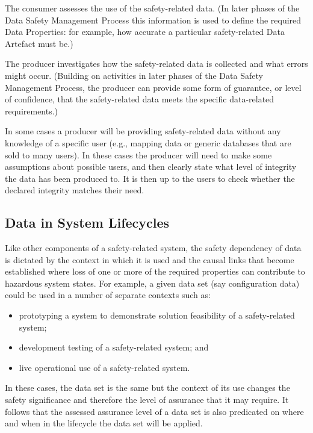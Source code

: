 The consumer assesses the use of the safety-related data. (In later phases of the Data Safety Management Process this information is used to define the required Data Properties: for example, how accurate a particular safety-related Data Artefact must be.)

The producer investigates how the safety-related data is collected and what errors might occur. (Building on activities in later phases of the Data Safety Management Process, the producer can provide some form of guarantee, or level of confidence, that the safety-related data meets the specific data-related requirements.)

In some cases a producer will be providing safety-related data without any knowledge of a specific user (e.g., mapping data or generic \glspl{database} that are sold to many users). In these cases the producer will need to make some assumptions about possible users, and then clearly state what level of integrity the data has been produced to. It is then up to the users to check whether the declared integrity matches their need.

\subsection{Data in System Lifecycles}
Like other components of a safety-related system, the safety dependency of data is dictated by the context in which it is used and the causal links that become established where loss of one or more of the required properties can contribute to hazardous system states. For example, a given data set (say \gls{configuration data}) could be used in a number of separate contexts such as:
\begin{itemize}
  \item prototyping a system to demonstrate solution feasibility of a safety-related system;
  \item development testing of a safety-related system; and
  \item live operational use of a safety-related system.
\end{itemize}

In these cases, the data set is the same but the context of its use changes the safety significance and therefore the level of assurance that it may require. It follows that the assessed assurance level of a data set is also predicated on where and when in the lifecycle the data set will be applied. 

